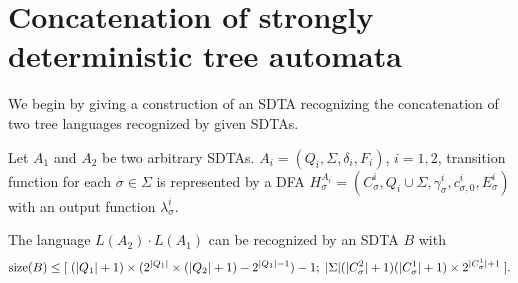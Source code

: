 \documentclass[copyright]{eptcs}
\begin{document}
\section{Concatenation of strongly deterministic tree automata}\label{con}

We begin by  giving a construction of an SDTA recognizing the
concatenation of two tree languages recognized by given
 SDTAs.

\begin{lemma}\label{cons}
Let $A_1$ and $A_2$ be two arbitrary SDTAs.
$A_i=(Q_i,\Sigma,\delta_i,F_i)$, $i=1,2$, transition function for
each $\sigma\in\Sigma$ is represented by a DFA
$H_{\sigma}^{A_i}=(C_{\sigma}^i, Q_i \cup \Sigma,
\gamma_{\sigma}^i, c_{\sigma,0}^i, E_{\sigma}^i)$ with an output
function $\lambda_\sigma^i$.

The language $L(A_2)\cdot L(A_1)$ can be recognized by an SDTA $B$
with
$${\rm size}(B ) \leq [ \; (|Q_1| + 1)\times (2^{|Q_1|}
\times (|Q_2|+1)-2^{|Q_1|-1})-1; \; |\Sigma| (|C_{\sigma}^2|+1)
(|C_{\sigma}^1|+1)\times 2^{|C_{\sigma}^1| + 1} \; ].$$
\end{lemma}
\end{document}
